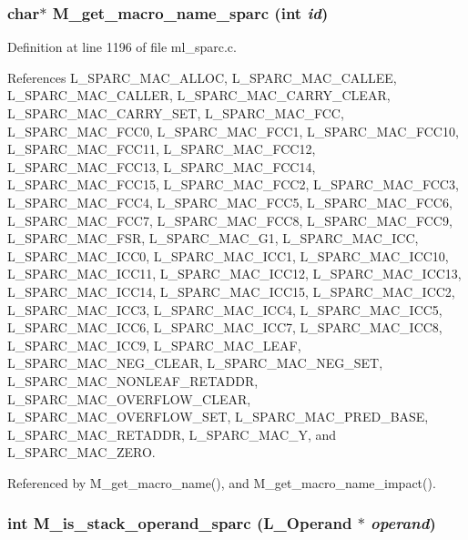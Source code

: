 \subsubsection{\setlength{\rightskip}{0pt plus 5cm}char$\ast$ M\_\-get\_\-macro\_\-name\_\-sparc (int {\em id})}\label{ml__sparc_8c_61872011cd25f3037443e7f3bef8625d}




Definition at line 1196 of file ml\_\-sparc.c.

References L\_\-SPARC\_\-MAC\_\-ALLOC, L\_\-SPARC\_\-MAC\_\-CALLEE, L\_\-SPARC\_\-MAC\_\-CALLER, L\_\-SPARC\_\-MAC\_\-CARRY\_\-CLEAR, L\_\-SPARC\_\-MAC\_\-CARRY\_\-SET, L\_\-SPARC\_\-MAC\_\-FCC, L\_\-SPARC\_\-MAC\_\-FCC0, L\_\-SPARC\_\-MAC\_\-FCC1, L\_\-SPARC\_\-MAC\_\-FCC10, L\_\-SPARC\_\-MAC\_\-FCC11, L\_\-SPARC\_\-MAC\_\-FCC12, L\_\-SPARC\_\-MAC\_\-FCC13, L\_\-SPARC\_\-MAC\_\-FCC14, L\_\-SPARC\_\-MAC\_\-FCC15, L\_\-SPARC\_\-MAC\_\-FCC2, L\_\-SPARC\_\-MAC\_\-FCC3, L\_\-SPARC\_\-MAC\_\-FCC4, L\_\-SPARC\_\-MAC\_\-FCC5, L\_\-SPARC\_\-MAC\_\-FCC6, L\_\-SPARC\_\-MAC\_\-FCC7, L\_\-SPARC\_\-MAC\_\-FCC8, L\_\-SPARC\_\-MAC\_\-FCC9, L\_\-SPARC\_\-MAC\_\-FSR, L\_\-SPARC\_\-MAC\_\-G1, L\_\-SPARC\_\-MAC\_\-ICC, L\_\-SPARC\_\-MAC\_\-ICC0, L\_\-SPARC\_\-MAC\_\-ICC1, L\_\-SPARC\_\-MAC\_\-ICC10, L\_\-SPARC\_\-MAC\_\-ICC11, L\_\-SPARC\_\-MAC\_\-ICC12, L\_\-SPARC\_\-MAC\_\-ICC13, L\_\-SPARC\_\-MAC\_\-ICC14, L\_\-SPARC\_\-MAC\_\-ICC15, L\_\-SPARC\_\-MAC\_\-ICC2, L\_\-SPARC\_\-MAC\_\-ICC3, L\_\-SPARC\_\-MAC\_\-ICC4, L\_\-SPARC\_\-MAC\_\-ICC5, L\_\-SPARC\_\-MAC\_\-ICC6, L\_\-SPARC\_\-MAC\_\-ICC7, L\_\-SPARC\_\-MAC\_\-ICC8, L\_\-SPARC\_\-MAC\_\-ICC9, L\_\-SPARC\_\-MAC\_\-LEAF, L\_\-SPARC\_\-MAC\_\-NEG\_\-CLEAR, L\_\-SPARC\_\-MAC\_\-NEG\_\-SET, L\_\-SPARC\_\-MAC\_\-NONLEAF\_\-RETADDR, L\_\-SPARC\_\-MAC\_\-OVERFLOW\_\-CLEAR, L\_\-SPARC\_\-MAC\_\-OVERFLOW\_\-SET, L\_\-SPARC\_\-MAC\_\-PRED\_\-BASE, L\_\-SPARC\_\-MAC\_\-RETADDR, L\_\-SPARC\_\-MAC\_\-Y, and L\_\-SPARC\_\-MAC\_\-ZERO.

Referenced by M\_\-get\_\-macro\_\-name(), and M\_\-get\_\-macro\_\-name\_\-impact().
\subsubsection{\setlength{\rightskip}{0pt plus 5cm}int M\_\-is\_\-stack\_\-operand\_\-sparc (L\_\-Operand $\ast$ {\em operand})}\label{ml__sparc_8c_08fa05cb5089960cd58a7de1f11ecdda}




